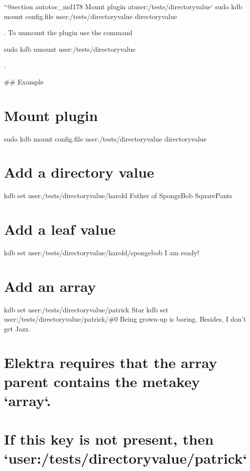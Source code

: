 ``{\ttfamily  @section autotoc\+\_\+md178 Mount plugin at}user\+:/tests/directoryvalue` sudo kdb mount config.\+file user\+:/tests/directoryvalue directoryvalue 
\begin{DoxyCode}
. To unmount the plugin use the command
\end{DoxyCode}
 sudo kdb umount user\+:/tests/directoryvalue 
\begin{DoxyCode}
.

## Example
\end{DoxyCode}
 \hypertarget{autotoc_md173_autotoc_md179}{}\section{Mount plugin}\label{autotoc_md173_autotoc_md179}
sudo kdb mount config.\+file user\+:/tests/directoryvalue directoryvalue\hypertarget{autotoc_md173_autotoc_md180}{}\section{Add a directory value}\label{autotoc_md173_autotoc_md180}
kdb set user\+:/tests/directoryvalue/harold \textquotesingle{}Father of Sponge\+Bob Square\+Pants\textquotesingle{} \hypertarget{autotoc_md173_autotoc_md181}{}\section{Add a leaf value}\label{autotoc_md173_autotoc_md181}
kdb set user\+:/tests/directoryvalue/harold/spongebob \textquotesingle{}I am ready!\textquotesingle{}\hypertarget{autotoc_md173_autotoc_md182}{}\section{Add an array}\label{autotoc_md173_autotoc_md182}
kdb set user\+:/tests/directoryvalue/patrick Star kdb set user\+:/tests/directoryvalue/patrick/\#0 \textquotesingle{}Being grown-\/up is boring. Besides, I don’t get Jazz.\textquotesingle{} \hypertarget{autotoc_md173_autotoc_md183}{}\section{Elektra requires that the array parent contains the metakey `array`.}\label{autotoc_md173_autotoc_md183}
\hypertarget{autotoc_md173_autotoc_md184}{}\section{If this key is not present, then `user\+:/tests/directoryvalue/patrick`}\label{autotoc_md173_autotoc_md184}
